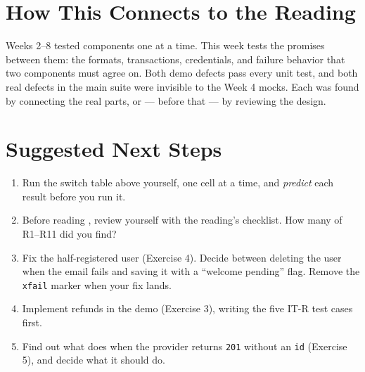 \documentclass[11pt]{article}
\begin{document}
\section{How This Connects to the Reading}
\begin{keyidea}
Weeks 2--8 tested components one at a time. This week tests the
promises between them: the formats, transactions, credentials, and
failure behavior that two components must agree on. Both demo defects
pass every unit test, and both real defects in the main suite were
invisible to the Week 4 mocks. Each was found by connecting the real
parts, or --- before that --- by reviewing the design.
\end{keyidea}

\section{Suggested Next Steps}
\begin{enumerate}
\item Run the switch table above yourself, one cell at a time, and
\emph{predict} each result before you run it.
\item Before reading , review
 yourself with the reading's
checklist. How many of R1--R11 did you find?
\item Fix the half-registered user (Exercise 4). Decide between deleting
the user when the email fails and saving it with a ``welcome pending''
flag. Remove the \texttt{xfail} marker when your fix lands.
\item Implement refunds in the demo (Exercise 3), writing the five
IT-R test cases first.
\item Find out what  does when the provider
returns \texttt{201} without an \texttt{id} (Exercise 5), and decide
what it should do.
\end{enumerate}
\end{document}
